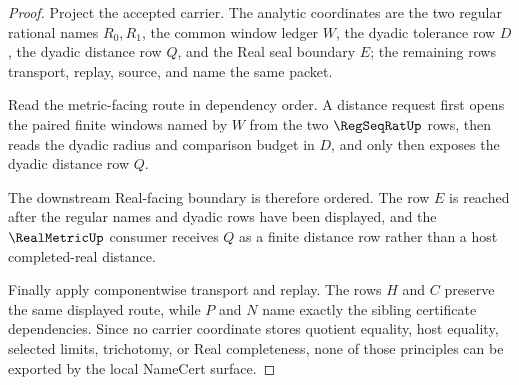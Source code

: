 \begin{proof}
Project the accepted carrier. The analytic coordinates are the two regular rational names $R_0,R_1$, the common window ledger $W$, the dyadic tolerance row $D$, the dyadic distance row $Q$, and the Real seal boundary $E$; the remaining rows transport, replay, source, and name the same packet.

Read the metric-facing route in dependency order. A distance request first opens the paired finite windows named by $W$ from the two $\RegSeqRatUp$ rows, then reads the dyadic radius and comparison budget in $D$, and only then exposes the dyadic distance row $Q$.

The downstream Real-facing boundary is therefore ordered. The row $E$ is reached after the regular names and dyadic rows have been displayed, and the $\RealMetricUp$ consumer receives $Q$ as a finite distance row rather than a host completed-real distance.

Finally apply componentwise transport and replay. The rows $H$ and $C$ preserve the same displayed route, while $P$ and $N$ name exactly the sibling certificate dependencies. Since no carrier coordinate stores quotient equality, host equality, selected limits, trichotomy, or Real completeness, none of those principles can be exported by the local NameCert surface.
\end{proof}

